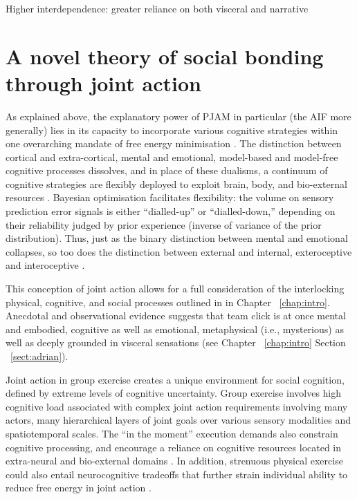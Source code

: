 \begin{CJK}{UTF8}{gbsn}
Higher interdependence: greater reliance on both visceral and narrative


































\section{A novel theory of social bonding through joint action\label{sect:novelTheory}}

As explained above, the explanatory power of PJAM in particular (the AIF more generally) lies in its capacity to incorporate various cognitive strategies within one overarching mandate of free energy minimisation \citep{Clark2015}.  The distinction between cortical and extra-cortical, mental and emotional, model-based and model-free cognitive processes dissolves, and in place of these dualisms, a continuum of cognitive strategies are flexibly deployed to exploit brain, body, and bio-external resources \citep{Pezzulo2013}.  Bayesian optimisation facilitates flexibility: the volume on sensory prediction error signals is either ``dialled-up'' or ``dialled-down,'' depending on their reliability judged by prior experience (inverse of variance of the prior distribution). Thus, just as the binary distinction between mental and emotional collapses, so too does the distinction between external and internal, exteroceptive and interoceptive \citep[and proprioceptive][]{Seth2013}.

This conception of joint action allows for a full consideration of the interlocking physical, cognitive, and social processes outlined in in Chapter ~\ref{chap:intro}.   Anecdotal and observational evidence suggests that team click is at once mental and embodied, cognitive as well as emotional, metaphysical (i.e., mysterious) as well as deeply grounded in visceral sensations (see Chapter ~\ref{chap:intro} Section ~\ref{sect:adrian}).

Joint action in group exercise creates a unique environment for social cognition, defined by extreme levels of cognitive uncertainty.  Group exercise involves high cognitive load associated with complex joint action requirements involving many actors, many hierarchical layers of joint goals over various sensory modalities and spatiotemporal scales. The ``in the moment'' execution demands also constrain cognitive processing, and encourage a reliance on cognitive resources located in extra-neural and bio-external domains \citep{Bourbousson2016}.  In addition, strenuous physical exercise could also entail neurocognitive tradeoffs that further strain individual ability to reduce free energy in joint action \citep{Dietrich2004b}.



\end{CJK}
